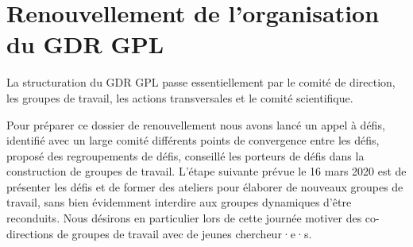\documentclass[11pt]{article}
\newcommand{\mynote}[3][black]{\textcolor{#1}{\fbox{\bfseries\sffamily\scriptsize{#2}}
{\small$\blacktriangleright$\textsf{\emph{#3}}$\blacktriangleleft$}}}
\newcommand{\pem}[1]{} %
\begin{document}



\section{Renouvellement de l'organisation du GDR GPL}\label{organisation}

La structuration du GDR GPL passe essentiellement 
par le comité de direction, les groupes de travail, les actions transversales et le comité scientifique.



Pour préparer ce dossier de renouvellement nous avons lancé un appel à défis, identifié avec un large comité différents points de convergence entre les défis, proposé des regroupements de défis, conseillé les porteurs de défis dans la construction de groupes de travail. L'étape suivante prévue le 16 mars 2020 est de présenter les défis et de former des ateliers pour élaborer de nouveaux groupes de travail, sans bien évidemment interdire aux groupes dynamiques d'être reconduits. Nous désirons en particulier lors de cette journée motiver des co-directions de groupes de travail avec de jeunes chercheur·e·s.
\end{document}
